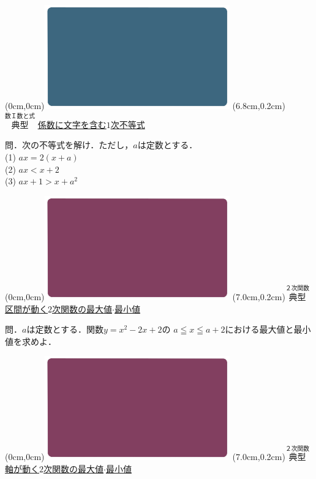 \documentclass[10pt,
fleqn,
dvipdfmx,
uplatex
]{jsarticle}
\begin{document}
\newpage



\at(0cm,0cm){\includegraphics[width=8cm,bb=0 0 1920 1080]{./youtube/thumbnails/templates/smart_background/数I数と式.jpeg}}
\at(6.8cm,0.2cm){\small\color{bradorange}$\overset{\text{数Ｉ数と式}}{\text{典型}}$}
{\color{orange}\Large\underline{係数に文字を含む$1$次不等式}}\vspace{0.3zw}

\large 
問．次の不等式を解け．ただし，$a$は定数とする．\\
(1)  $ax=2\left(x+a\right)$\\
(2)  $ax<x+2$\\
(3)  $ax+1>x+a^2$\\



\newpage



\at(0cm,0cm){\includegraphics[width=8cm,bb=0 0 1920 1080]{./youtube/thumbnails/templates/smart_background/２次関数.jpeg}}
\at(7.0cm,0.2cm){\small\color{bradorange}$\overset{\text{２次関数}}{\text{典型}}$}
{\color{orange}\large\underline{区間が動く$2$次関数の最大値$\cdot$最小値}}\vspace{0.3zw}

\Large 
問．$a$は定数とする．関数$y=x^2-2x+2$の
$a\leqq x\leqq a+2$における最大値と最小値を求めよ．


\newpage



\at(0cm,0cm){\includegraphics[width=8cm,bb=0 0 1920 1080]{./youtube/thumbnails/templates/smart_background/２次関数.jpeg}}
\at(7.0cm,0.2cm){\small\color{bradorange}$\overset{\text{２次関数}}{\text{典型}}$}
{\color{orange}\Large\underline{軸が動く$2$次関数の最大値$\cdot$最小値}}\vspace{0.3zw}
\end{document}
